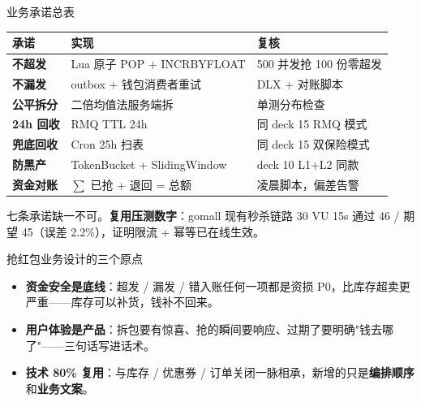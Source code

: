 \begin{frame}{业务承诺总表}
\begin{tabular}{@{}lll@{}}
\toprule
承诺 & 实现 & 复核 \\
\midrule
\textbf{不超发}      & Lua 原子 POP + INCRBYFLOAT       & 500 并发抢 100 份零超发 \\
\textbf{不漏发}     & outbox + 钱包消费者重试           & DLX + 对账脚本 \\
\textbf{公平拆分}    & 二倍均值法服务端拆               & 单测分布检查 \\
\textbf{24h 回收}    & RMQ TTL 24h                       & 同 deck 15 RMQ 模式 \\
\textbf{兜底回收}    & Cron 25h 扫表                     & 同 deck 15 双保险模式 \\
\textbf{防黑产}      & TokenBucket + SlidingWindow      & deck 10 L1+L2 同款 \\
\textbf{资金对账}    & $\sum$ 已抢 + 退回 = 总额           & 凌晨脚本，偏差告警 \\
\bottomrule
\end{tabular}
\vspace{2mm}
\small 七条承诺缺一不可。\textbf{复用压测数字}：gomall 现有秒杀链路 30 VU 15s 通过 46 / 期望 45（误差 2.2\%），证明限流 + 幂等已在线生效。
\end{frame}

\begin{frame}{抢红包业务设计的三个原点}
\begin{itemize}
  \item \textbf{资金安全是底线}：超发 / 漏发 / 错入账任何一项都是资损 P0，比库存超卖更严重——库存可以补货，钱补不回来。
  \item \textbf{用户体验是产品}：拆包要有惊喜、抢的瞬间要响应、过期了要明确"钱去哪了"——三句话写进话术。
  \item \textbf{技术 80\% 复用}：与库存 / 优惠券 / 订单关闭一脉相承，新增的只是\textbf{编排顺序}和\textbf{业务文案}。
\end{itemize}
\end{frame}

\appendix

